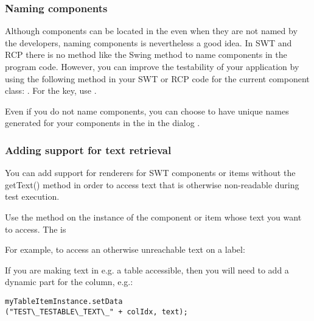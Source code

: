 
\subsubsection{Naming components}
Although  components  can be located in the \gdaut{} even when they are not named by the developers, naming components is nevertheless a good idea. In SWT and RCP there is no method like the Swing  method to name components in the program code. However, you can improve the testability of your application by using the following method in your SWT or RCP code for the current component class: . For the key, use . 

Even if you do not name components, you can choose to have unique names generated for your components in the \gdaut{} in the \gdaut{} dialog . 

\subsubsection{Adding support for text retrieval}

You can add support for renderers for SWT components or items  without the getText() method in order to access text that is otherwise non-readable during test execution. 

Use the method  on the instance of the component or item whose text you want to access. The  is 

For example, to access an otherwise unreachable text on a label:\\

If you are making text in e.g. a table accessible, then you will need to add a dynamic part for the column, e.g.:\\
\begin{verbatim}
myTableItemInstance.setData
("TEST\_TESTABLE\_TEXT\_" + colIdx, text);
\end{verbatim}

